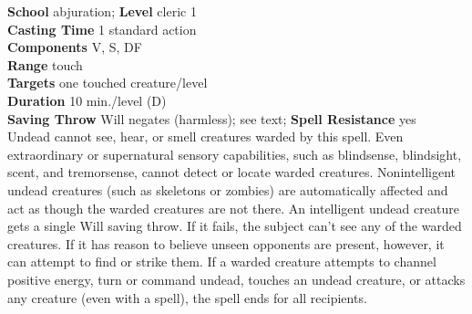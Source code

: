 \textbf{School} abjuration; \textbf{Level} cleric 1\\
\textbf{Casting Time} 1 standard action\\
\textbf{Components} V, S, DF\\
\textbf{Range} touch\\
\textbf{Targets} one touched creature/level\\
\textbf{Duration} 10 min./level (D)\\
\textbf{Saving Throw }Will negates (harmless); see text; \textbf{Spell Resistance} yes\\
Undead cannot see, hear, or smell creatures warded by this spell. Even extraordinary or supernatural sensory capabilities, such as blindsense, blindsight, scent, and tremorsense, cannot detect or locate warded creatures. Nonintelligent undead creatures (such as skeletons or zombies) are automatically affected and act as though the warded creatures are not there. An intelligent undead creature gets a single Will saving throw. If it fails, the subject can't see any of the warded creatures. If it has reason to believe unseen opponents are present, however, it can attempt to find or strike them. If a warded creature attempts to channel positive energy, turn or command undead, touches an undead creature, or attacks any creature (even with a spell), the spell ends for all recipients.\\
